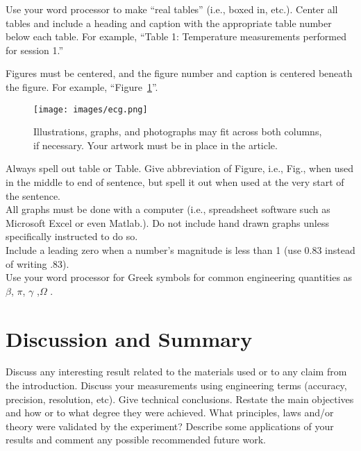 \documentclass[journal]{IEEEtran}
\begin{document}

Use your word processor to make “real tables” (i.e., boxed in, etc.). Center all tables and include a heading and caption with the appropriate table number below each table. For example, “Table 1: Temperature measurements performed for session 1.” 

Figures must be centered, and the figure number and caption is centered beneath the
figure. For example, “Figure~\ref{fig:ecg}”. 

\begin{figure}[H]%
\begin {center}
\texttt{[image: images/ecg.png]}
\caption{Illustrations, graphs, and photographs may fit across both columns, if necessary. Your artwork must be in place in the article.}
\label{fig:ecg}
\end {center}
\end{figure}

Always spell out table or Table. Give abbreviation of Figure, i.e., Fig., when used in
the middle to end of sentence, but spell it out when used at the very start of the
sentence. \\


All graphs must be done with a computer (i.e., spreadsheet software such as
Microsoft Excel or even Matlab.). Do not include hand drawn graphs unless
specifically instructed to do so.  \\
Include a leading zero when a number’s magnitude is less than 1 (use 0.83 instead of
writing .83). \\
Use your word processor for Greek symbols for common engineering quantities as $\beta$, $\pi$, $\gamma$ ,$\Omega$ . 

\section{Discussion and Summary}
Discuss any interesting result related to the materials used or to any claim from the introduction. Discuss your measurements using engineering terms (accuracy, precision, resolution, etc).  Give technical conclusions. Restate the main objectives and how or to what degree they were achieved. What principles, laws and/or theory
were validated by the experiment? Describe some applications of your results and comment any possible recommended future work.



\end{document}
